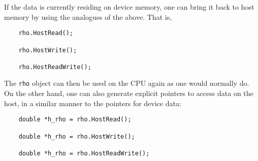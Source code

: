 \documentclass[a4paper,11pt]{article}
\begin{document}
If the data is currently residing on device memory, one can bring it back to host memory by using the analogues of the above. That is,
\begin{lstlisting}
    rho.HostRead();

    rho.HostWrite();

    rho.HostReadWrite();
\end{lstlisting}
 The \texttt{rho} object can then be used on the CPU again as one would normally do. On the other hand, one can also generate explicit pointers to access data on the host, in a similar manner to the pointers for device data:
\begin{lstlisting}
    double *h_rho = rho.HostRead();

    double *h_rho = rho.HostWrite();

    double *h_rho = rho.HostReadWrite();
\end{lstlisting}
\end{document}
